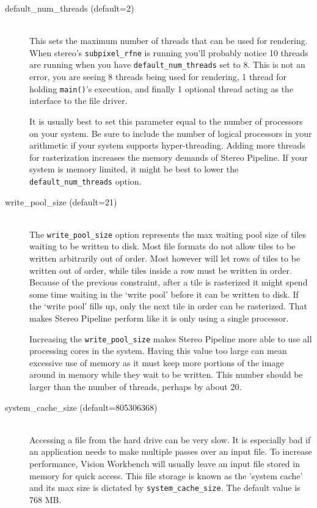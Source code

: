 \begin{description}

\item[default\_num\_threads \textnormal (default=2)] \hfill \\
This sets the maximum number of threads that can be used for
rendering. When stereo's \texttt{subpixel\_rfne} is running you'll
probably notice 10 threads are running when you have
\texttt{default\_num\_threads} set to 8. This is not an error, you are
seeing 8 threads being used for rendering, 1 thread for holding
\texttt{main()}'s execution, and finally 1 optional thread acting as the
interface to the file driver.

It is usually best to set this parameter equal to the number of
processors on your system. Be sure to include the number of logical
processors in your arithmetic if your system supports hyper-threading.
Adding more threads for rasterization increases the memory demands of
Stereo Pipeline. If your system is memory limited, it might be best to
lower the \texttt{default\_num\_threads} option.

\item[write\_pool\_size \textnormal (default=21)] \hfill \\
The \texttt{write\_pool\_size} option represents the max waiting pool
size of tiles waiting to be written to disk. Most file formats do not
allow tiles to be written arbitrarily out of order. Most however will
let rows of tiles to be written out of order, while tiles inside a row
must be written in order. Because of the previous constraint, after a
tile is rasterized it might spend  some time waiting in the `write
pool' before it can be written to disk. If the `write pool' fills up,
only the next tile in order can be rasterized. That makes Stereo
Pipeline perform like it is only using a single processor.

Increasing the \texttt{write\_pool\_size} makes Stereo Pipeline more
able to use all processing cores in the system. Having this value too
large can mean excessive use of memory as it must keep more portions
of the image around in memory while they wait to be written. This 
number should be larger than the number of threads, perhaps by
about 20.

\item[system\_cache\_size \textnormal (default=805306368)] \hfill \\
Accessing a file from the hard drive can be very slow. It is especially
bad if an application needs to make multiple passes over an input
file. To increase performance, Vision Workbench will usually leave an
input file stored in memory for quick access. This file storage is
known as the 'system cache' and its max size is dictated by
\texttt{system\_cache\_size}. The default value is 768 MB.


\end{description}
